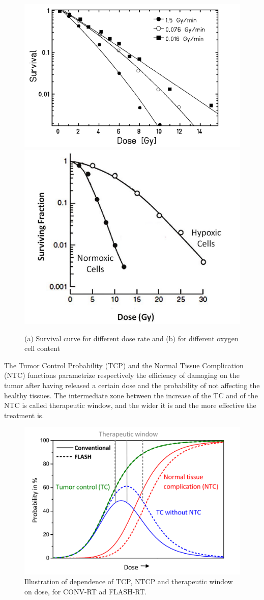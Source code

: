             \begin{figure}[h!]
                \centering
                \includegraphics[width=.49\linewidth]{figures/pixel_detectors_usage/survival_curve.png}
                \includegraphics[width=.45\linewidth]{figures/pixel_detectors_usage/survival_curve_oxygen.png}
                \caption{(a) Survival curve for different dose rate and (b) for different oxygen cell content}
                \label{fig:damage_vs_dose}
            \end{figure}               
            The Tumor Control Probability (TCP) and the Normal Tissue Complication (NTC) functions parametrize respectively the efficiency of damaging on the tumor after having released a certain dose and the probability of not affecting the healthy tissues. The intermediate zone between the increase of the TC and of the NTC is called therapeutic window, and the wider it is and the more effective the treatment is. 
            \begin{figure}
                \centering
                \includegraphics[width=.7\linewidth]{figures/pixel_detectors_usage/curve_flash.png}
                \caption{Illustration of dependence of TCP, NTCP and therapeutic window on dose, for CONV-RT ad FLASH-RT.}
                \label{fig:therapeutic_window}
            \end{figure}

